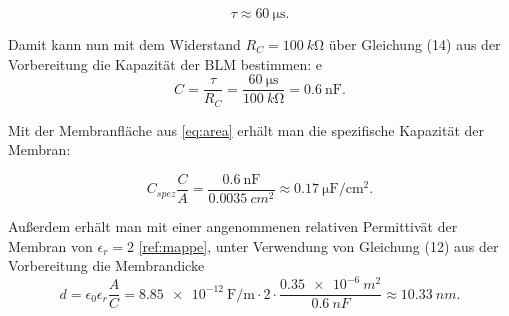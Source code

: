 \documentclass[a4paper,ngerman]{scrartcl}
\begin{document}
\begin{equation}
  \tau \approx \SI{60}{\micro\s}.
\end{equation}

Damit kann nun  mit dem Widerstand $R_C = \SI{100}{k\ohm}$ %
über Gleichung (14) aus der Vorbereitung die Kapazität der BLM bestimmen:
e\begin{equation}
 C = \frac{\tau}{R_C} = \frac{\SI{60}{\micro\s}}{\SI{100}{k\ohm}} = \SI{0,6}{\nano\farad}.
\end{equation}

Mit der Membranfläche aus \eqref{eq:area} erhält man die spezifische Kapazität der Membran:

\begin{equation}
  C_{spez} \frac{C}{A} = \frac{\SI{0,6}{\nano\farad}}{\SI{0,0035}{cm^2}} \approx \SI{0,17}{\micro\farad\per\cm^2}.
\end{equation}

Außerdem erhält man mit einer angenommenen relativen Permittivät der Membran von $\epsilon_r = 2 $ \ref{ref:mappe},
unter Verwendung von Gleichung (12) aus der Vorbereitung 
die Membrandicke
\begin{equation}
  d = \epsilon_0 \epsilon_r \frac{A}{C} = \SI{8,85e-12}{\farad\per\m} \cdot 2 \cdot \frac{\SI{0,35e-6}{m^2}}{\SI{0,6}{nF}} 
\approx \SI{10,33}{nm}.
\end{equation}
\end{document}
